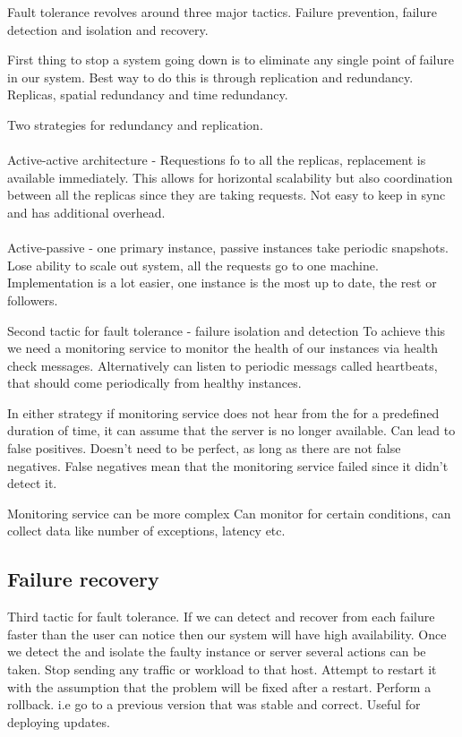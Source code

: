 \documentclass[a4paper, 11pt]{book}
\begin{document}
    Fault tolerance revolves around three major tactics.
    Failure prevention, failure detection and isolation and recovery.

    First thing to stop a system going down is to eliminate any single point of failure in our system.
    Best way to do this is through replication and redundancy.
    Replicas, spatial redundancy and time redundancy.

    Two strategies for redundancy and replication.

    \paragraph{}
    Active-active architecture - Requestions fo to all the replicas, replacement is available immediately.
    This allows for horizontal scalability but also coordination between all the replicas since they are taking requests.
    Not easy to keep in sync and has additional overhead.

    \paragraph{}
    Active-passive - one primary instance, passive instances take periodic snapshots.
    Lose ability to scale out system, all the requests go to one machine.
    Implementation is a lot easier, one instance is the most up to date, the rest or followers.

    Second tactic for fault tolerance - failure isolation and detection
    To achieve this we need a monitoring service to monitor the health of our instances via health check messages.
    Alternatively can listen to periodic messags called heartbeats, that should come periodically from healthy instances.

    In either strategy if monitoring service does not hear from the for a predefined duration of time, it can assume that the server is no longer available.
    Can lead to false positives.
    Doesn't need to be perfect, as long as there are not false negatives.
    False negatives mean that the monitoring service failed since it didn't detect it.

    Monitoring service can be more complex
    Can monitor for certain conditions, can collect data like number of exceptions, latency etc.

    \subsection{Failure recovery}
    Third tactic for fault tolerance.
    If we can detect and recover from each failure faster than the user can notice then our system will have high availability.
    Once we detect the and isolate the faulty instance or server several actions can be taken.
    Stop sending any traffic or workload to that host.
    Attempt to restart it with the assumption that the problem will be fixed after a restart.
    Perform a rollback.
    i.e go to a previous version that was stable and correct. Useful for deploying updates.
\end{document}
